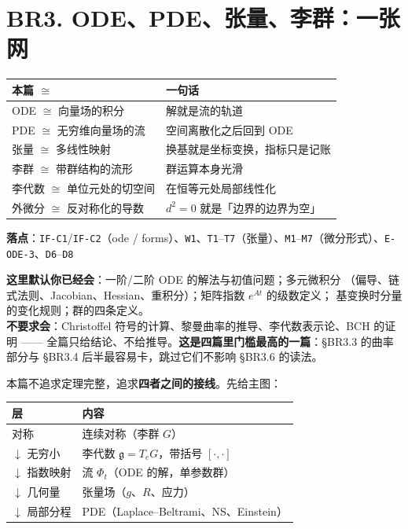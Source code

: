 \section{BR3. ODE、PDE、张量、李群：一张网}
\label{sec:br3}

\begin{center}
\small
\begin{tabular}{L{3.4cm}L{10.4cm}}
\toprule
\textbf{本篇 $\cong$} & \textbf{一句话} \\
\midrule
ODE $\cong$ 向量场的积分 & 解就是流的轨道 \\
PDE $\cong$ 无穷维向量场的流 & 空间离散化之后回到 ODE \\
张量 $\cong$ 多线性映射 & 换基就是坐标变换，指标只是记账 \\
李群 $\cong$ 带群结构的流形 & 群运算本身光滑 \\
李代数 $\cong$ 单位元处的切空间 & 在恒等元处局部线性化 \\
外微分 $\cong$ 反对称化的导数 & $d^2=0$ 就是「边界的边界为空」 \\
\bottomrule
\end{tabular}
\end{center}

\noindent\textbf{落点}：\texttt{IF-C1}/\texttt{IF-C2}（ode / forms）、\texttt{W1}、\texttt{T1}--\texttt{T7}（张量）、\texttt{M1}--\texttt{M7}（微分形式）、\texttt{E-ODE-3}、\texttt{D6}--\texttt{D8}

\noindent\small\textbf{这里默认你已经会}：一阶/二阶 ODE 的解法与初值问题；多元微积分
（偏导、链式法则、Jacobian、Hessian、重积分）；矩阵指数 $e^{At}$ 的级数定义；
基变换时分量的变化规则；群的四条定义。\\
\textbf{不要求会}：Christoffel 符号的计算、黎曼曲率的推导、李代数表示论、BCH 的证明 ——
全篇只给结论、不给推导。\textbf{这是四篇里门槛最高的一篇}：\S BR3.3 的曲率部分与
\S BR3.4 后半最容易卡，跳过它们不影响 \S BR3.6 的读法。\normalsize
\smallskip

本篇不追求定理完整，追求\textbf{四者之间的接线}。先给主图：

\begin{center}
\begin{tabular}{L{2.2cm}L{9.5cm}}
\toprule
\textbf{层} & \textbf{内容} \\
\midrule
对称 & 连续对称（李群 $G$） \\
$\downarrow$ 无穷小 & 李代数 $\mathfrak{g}=T_eG$，带括号 $[\cdot,\cdot]$ \\
$\downarrow$ 指数映射 & 流 $\Phi_t$（ODE 的解，单参数群） \\
$\downarrow$ 几何量 & 张量场（$g$、$R$、应力） \\
$\downarrow$ 局部分程 & PDE（Laplace--Beltrami、NS、Einstein） \\
\bottomrule
\end{tabular}
\end{center}

